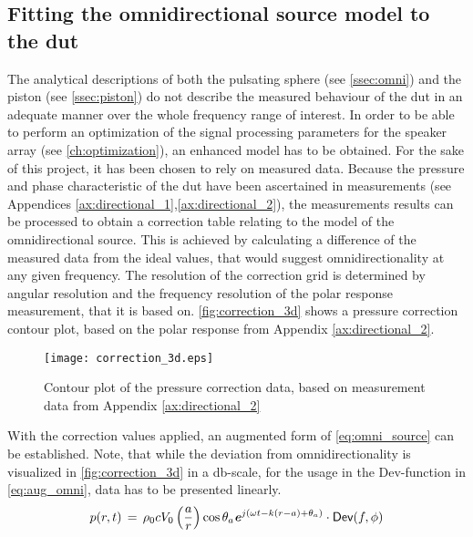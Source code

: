 \subsection{Fitting the omnidirectional source model to the \gls{dut}}\label{sec:correction}
The analytical descriptions of both the pulsating sphere (see \autoref{ssec:omni}) and the piston (see \autoref{ssec:piston}) do not describe the measured behaviour of the \gls{dut} in an adequate manner over the whole frequency range of interest. In order to be able to perform an optimization of the signal processing parameters for the speaker array (see \autoref{ch:optimization}), an enhanced model has to be obtained. For the sake of this project, it has been chosen to rely on measured data.
Because the pressure and phase characteristic of the \gls{dut} have been ascertained in measurements (see Appendices \ref{ax:directional_1},\ref{ax:directional_2}), the measurements results can be processed to obtain a correction table relating to the model of the omnidirectional source. This is achieved by calculating a difference of the measured data from the ideal values, that would suggest omnidirectionality at any given frequency. The resolution of the correction grid is determined by angular resolution and the frequency resolution of the polar response measurement, that it is based on.  \autoref{fig:correction_3d} shows a pressure correction contour plot, based on the polar response from Appendix \ref{ax:directional_2}.
\begin{figure}[H]
	\centering
	\texttt{[image: correction\_3d.eps]}
	\caption{Contour plot of the pressure correction data, based on measurement data from Appendix \ref{ax:directional_2}}
		\label{fig:correction_3d}
\end{figure}
With the correction values applied, an augmented form of \autoref{eq:omni_source} can be established. Note, that while the deviation from omnidirectionality is visualized in \autoref{fig:correction_3d} in a \si{\decibel}-scale, for the usage in the \textsf{Dev}-function in \autoref{eq:aug_omni}, data has to be presented linearly.
\begin{equation}\label{eq:aug_omni}
p(r,t)\,=\,\rho_0 c V_0 \left(\frac{a}{r}\right)\cos \theta_a \textbf{\textit{e}}^{j\left(\omega t - k(r-a)+\theta_a\right)}\cdot\textsf{Dev}(f,\phi)
\end{equation}

\startexplain
{}
\stopexplain



